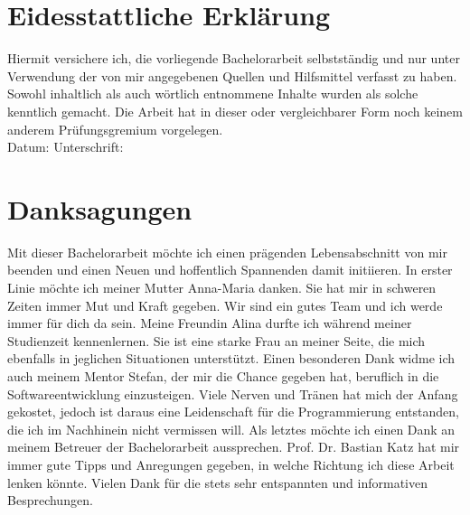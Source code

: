 \setcounter{secnumdepth}{0}
\section{Eidesstattliche Erklärung}

Hiermit versichere ich, die vorliegende Bachelorarbeit selbstständig und nur unter Verwendung der von mir angegebenen Quellen und Hilfsmittel verfasst zu haben. Sowohl inhaltlich als auch wörtlich entnommene Inhalte wurden als solche kenntlich gemacht. Die Arbeit hat in dieser oder vergleichbarer Form noch keinem anderem Prüfungsgremium vorgelegen.
\\[1.5cm]
Datum:	\hrulefill\enspace Unterschrift: \hrulefill


\newpage

\section{Danksagungen}
Mit dieser Bachelorarbeit möchte ich einen prägenden Lebensabschnitt von mir beenden und einen Neuen und hoffentlich Spannenden damit initiieren. In erster Linie möchte ich meiner Mutter Anna-Maria danken. Sie hat mir in schweren Zeiten immer Mut und Kraft gegeben. Wir sind ein gutes Team und ich werde immer für dich da sein. Meine Freundin Alina durfte ich während meiner Studienzeit kennenlernen. Sie ist eine starke Frau an meiner Seite, die mich ebenfalls in jeglichen Situationen unterstützt. Einen besonderen Dank widme ich auch meinem Mentor Stefan, der mir die Chance gegeben hat, beruflich in die Softwareentwicklung einzusteigen. Viele Nerven und Tränen hat mich der Anfang gekostet, jedoch ist daraus eine Leidenschaft für die Programmierung entstanden, die ich im Nachhinein nicht vermissen will. Als letztes möchte ich einen Dank an meinem Betreuer der Bachelorarbeit aussprechen. Prof. Dr. Bastian Katz hat mir immer gute Tipps und Anregungen gegeben, in welche Richtung ich diese Arbeit lenken könnte. Vielen Dank für die stets sehr entspannten und informativen Besprechungen.
